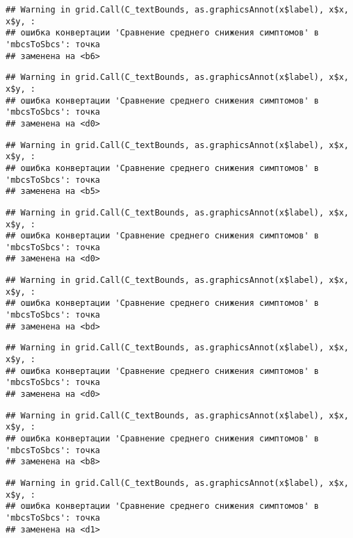\documentclass[
]{article}
\begin{document}
\begin{verbatim}
## Warning in grid.Call(C_textBounds, as.graphicsAnnot(x$label), x$x, x$y, :
## ошибка конвертации 'Сравнение среднего снижения симптомов' в 'mbcsToSbcs': точка
## заменена на <b6>
\end{verbatim}

\begin{verbatim}
## Warning in grid.Call(C_textBounds, as.graphicsAnnot(x$label), x$x, x$y, :
## ошибка конвертации 'Сравнение среднего снижения симптомов' в 'mbcsToSbcs': точка
## заменена на <d0>
\end{verbatim}

\begin{verbatim}
## Warning in grid.Call(C_textBounds, as.graphicsAnnot(x$label), x$x, x$y, :
## ошибка конвертации 'Сравнение среднего снижения симптомов' в 'mbcsToSbcs': точка
## заменена на <b5>
\end{verbatim}

\begin{verbatim}
## Warning in grid.Call(C_textBounds, as.graphicsAnnot(x$label), x$x, x$y, :
## ошибка конвертации 'Сравнение среднего снижения симптомов' в 'mbcsToSbcs': точка
## заменена на <d0>
\end{verbatim}

\begin{verbatim}
## Warning in grid.Call(C_textBounds, as.graphicsAnnot(x$label), x$x, x$y, :
## ошибка конвертации 'Сравнение среднего снижения симптомов' в 'mbcsToSbcs': точка
## заменена на <bd>
\end{verbatim}

\begin{verbatim}
## Warning in grid.Call(C_textBounds, as.graphicsAnnot(x$label), x$x, x$y, :
## ошибка конвертации 'Сравнение среднего снижения симптомов' в 'mbcsToSbcs': точка
## заменена на <d0>
\end{verbatim}

\begin{verbatim}
## Warning in grid.Call(C_textBounds, as.graphicsAnnot(x$label), x$x, x$y, :
## ошибка конвертации 'Сравнение среднего снижения симптомов' в 'mbcsToSbcs': точка
## заменена на <b8>
\end{verbatim}

\begin{verbatim}
## Warning in grid.Call(C_textBounds, as.graphicsAnnot(x$label), x$x, x$y, :
## ошибка конвертации 'Сравнение среднего снижения симптомов' в 'mbcsToSbcs': точка
## заменена на <d1>
\end{verbatim}
\end{document}
